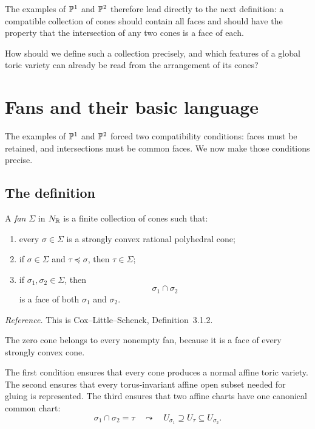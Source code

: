 The examples of \(\mathbb{P}^1\) and \(\mathbb{P}^2\) therefore lead directly to
the next definition: a compatible collection of cones should contain
all faces and should have the property that the intersection of any
two cones is a face of each.

\begin{guidingquestion}
How should we define such a collection precisely, and which features
of a global toric variety can already be read from the arrangement of
its cones?
\end{guidingquestion}


\section{Fans and their basic language}
\label{sec:fans-basic-language}

The examples of \(\mathbb{P}^1\) and \(\mathbb{P}^2\) forced two compatibility
conditions: faces must be retained, and intersections must be common
faces. We now make those conditions precise.

\subsection{The definition}

\begin{definition}[Fan]
\label{def:fan}
A \emph{fan} \(\Sigma\) in \(N_{\mathbb{R}}\) is a finite collection of
cones such that:
\begin{enumerate}[label=(\alph*),wide=0pt]
\item every \(\sigma\in\Sigma\) is a strongly convex rational
polyhedral cone;
\item if \(\sigma\in\Sigma\) and \(\tau\preceq\sigma\), then
\(\tau\in\Sigma\);
\item if \(\sigma_1,\sigma_2\in\Sigma\), then
\[
\sigma_1\cap\sigma_2
\]
is a face of both \(\sigma_1\) and \(\sigma_2\).
\end{enumerate}
\end{definition}

\noindent
\textit{Reference.}
This is Cox--Little--Schenck, Definition~3.1.2.

The zero cone belongs to every nonempty fan, because it is a face of
every strongly convex cone.

The first condition ensures that every cone produces a normal affine
toric variety. The second ensures that every torus-invariant affine
open subset needed for gluing is represented. The third ensures that
two affine charts have one canonical common chart:
\[
\sigma_1\cap\sigma_2=\tau
\quad\leadsto\quad
U_{\sigma_1}\supseteq U_\tau\subseteq U_{\sigma_2}.
\]

